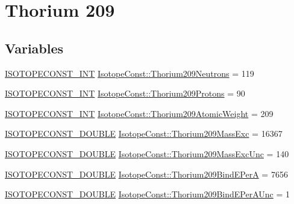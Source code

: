 \hypertarget{group___isotope_const-_thorium-_th209}{}\section{Thorium 209}
\label{group___isotope_const-_thorium-_th209}
\subsection*{Variables}
\begin{DoxyCompactItemize}
\item 
\mbox{\hyperlink{group___isotope_const-_macros_ga5f18360b3e99483a35c32d789e62621c}{I\+S\+O\+T\+O\+P\+E\+C\+O\+N\+S\+T\+\_\+\+I\+NT}} \mbox{\hyperlink{group___isotope_const-_thorium-_th209_gaca9279600406b2b4a858cae009086972}{Isotope\+Const\+::\+Thorium209\+Neutrons}} = 119
\item 
\mbox{\hyperlink{group___isotope_const-_macros_ga5f18360b3e99483a35c32d789e62621c}{I\+S\+O\+T\+O\+P\+E\+C\+O\+N\+S\+T\+\_\+\+I\+NT}} \mbox{\hyperlink{group___isotope_const-_thorium-_th209_gac0ce698b60a3d6cfa46812bf5f6dd4f8}{Isotope\+Const\+::\+Thorium209\+Protons}} = 90
\item 
\mbox{\hyperlink{group___isotope_const-_macros_ga5f18360b3e99483a35c32d789e62621c}{I\+S\+O\+T\+O\+P\+E\+C\+O\+N\+S\+T\+\_\+\+I\+NT}} \mbox{\hyperlink{group___isotope_const-_thorium-_th209_gab0da6a9121d8cdf4b185ad62f62c8344}{Isotope\+Const\+::\+Thorium209\+Atomic\+Weight}} = 209
\item 
\mbox{\hyperlink{group___isotope_const-_macros_ga8f45a7272ce02c0b4c65c44636ed719a}{I\+S\+O\+T\+O\+P\+E\+C\+O\+N\+S\+T\+\_\+\+D\+O\+U\+B\+LE}} \mbox{\hyperlink{group___isotope_const-_thorium-_th209_ga5992d540ba8e0e1ef7de9c07af255834}{Isotope\+Const\+::\+Thorium209\+Mass\+Exc}} = 16367
\item 
\mbox{\hyperlink{group___isotope_const-_macros_ga8f45a7272ce02c0b4c65c44636ed719a}{I\+S\+O\+T\+O\+P\+E\+C\+O\+N\+S\+T\+\_\+\+D\+O\+U\+B\+LE}} \mbox{\hyperlink{group___isotope_const-_thorium-_th209_ga0a20003e7b2707a4e490edf7ec32cef2}{Isotope\+Const\+::\+Thorium209\+Mass\+Exc\+Unc}} = 140
\item 
\mbox{\hyperlink{group___isotope_const-_macros_ga8f45a7272ce02c0b4c65c44636ed719a}{I\+S\+O\+T\+O\+P\+E\+C\+O\+N\+S\+T\+\_\+\+D\+O\+U\+B\+LE}} \mbox{\hyperlink{group___isotope_const-_thorium-_th209_ga5e52cbc3286ca76efccde0515036e545}{Isotope\+Const\+::\+Thorium209\+Bind\+E\+PerA}} = 7656
\item 
\mbox{\hyperlink{group___isotope_const-_macros_ga8f45a7272ce02c0b4c65c44636ed719a}{I\+S\+O\+T\+O\+P\+E\+C\+O\+N\+S\+T\+\_\+\+D\+O\+U\+B\+LE}} \mbox{\hyperlink{group___isotope_const-_thorium-_th209_ga5edb49f2a10ae8820b920338fb5309a1}{Isotope\+Const\+::\+Thorium209\+Bind\+E\+Per\+A\+Unc}} = 1

\end{DoxyCompactItemize}
